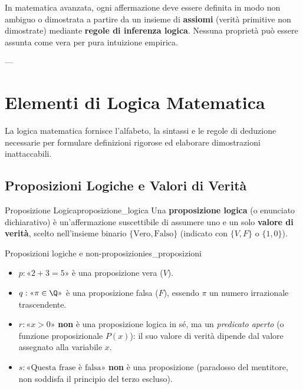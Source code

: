 \begin{osservazione}
In matematica avanzata, ogni affermazione deve essere definita in modo non ambiguo o dimostrata a partire da un insieme di \textbf{assiomi} (verità primitive non dimostrate) mediante \textbf{regole di inferenza logica}. Nessuna proprietà può essere assunta come vera per pura intuizione empirica.
\end{osservazione}

---

\section{Elementi di Logica Matematica}

La logica matematica fornisce l'alfabeto, la sintassi e le regole di deduzione necessarie per formulare definizioni rigorose ed elaborare dimostrazioni inattaccabili.

\subsection{Proposizioni Logiche e Valori di Verità}

\begin{definizione}{Proposizione Logica}{proposizione_logica}
Una \textbf{proposizione logica} (o enunciato dichiarativo) è un'affermazione suscettibile di assumere uno e un solo \textbf{valore di verità}, scelto nell'insieme binario $\{\text{Vero}, \text{Falso}\}$ (indicato con $\{V, F\}$ o $\{1, 0\}$).
\end{definizione}

\begin{esempio}{Proposizioni logiche e non-proposizioni}{es_proposizioni}
\begin{itemize}
    \item $p: \text{«}2 + 3 = 5\text{»}$ è una proposizione vera ($V$).
    \item $q: \text{«} \pi \in \Q \text{»}$ è una proposizione falsa ($F$), essendo $\pi$ un numero irrazionale trascendente.
    \item $r: \text{«} x > 0 \text{»}$ \textbf{non} è una proposizione logica in sé, ma un \emph{predicato aperto} (o funzione proposizionale $P(x)$): il suo valore di verità dipende dal valore assegnato alla variabile $x$.
    \item $s: \text{«Questa frase è falsa»}$ \textbf{non} è una proposizione (paradosso del mentitore, non soddisfa il principio del terzo escluso).
\end{itemize}
\end{esempio}

